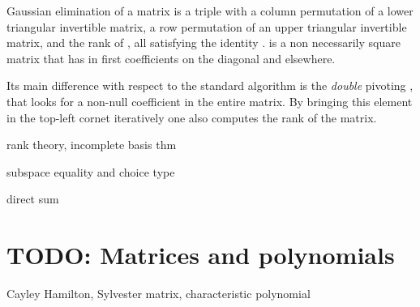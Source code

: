 Gaussian elimination of a matrix
 is a triple  with  a column permutation of a
lower triangular invertible matrix,  a row permutation of an upper
triangular invertible matrix, and  the rank of , all
satisfying the identity .
 is a non necessarily square matrix that has  in 
first coefficients on the diagonal and  elsewhere.

Its main difference with respect to the standard algorithm
is the \emph{double} pivoting \C{[pick ij | A ij.1 ij.2 != 0]}, that
looks for a non-null coefficient in the entire matrix.  By bringing
this element in the top-left cornet iteratively one also computes the rank
of the matrix.

rank theory, incomplete basis thm

subspace equality and choice type

direct sum

\cite{gonthier:hal-00805966}

\section{TODO: Matrices and polynomials}

Cayley Hamilton, Sylvester matrix, characteristic polynomial
